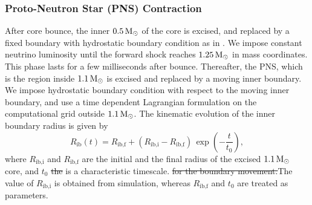 \documentclass[fleqn,usenatbib]{mnras}
\newcommand{\solm}{\xspace\ensuremath{\rm{M_{\odot}}}\xspace}
\newcommand{\NY}[2]{{\color{blue}\sout{#1}#2}}
\begin{document}
\subsubsection{Proto-Neutron Star (PNS) Contraction}\label{subsec:pnscontr}

After core bounce, the inner $0.5\, \solm$ of the core is excised, and replaced by a fixed boundary with hydrostatic boundary condition as in \citet{Ertl2016}. We impose constant neutrino luminosity until the forward shock reaches $1.25\, \solm$ in mass coordinates. This phase lasts for a few milliseconds after bounce. Thereafter, the PNS, which is the region inside $1.1\, \solm$ is  excised and replaced by a moving inner boundary. We impose hydrostatic boundary condition with respect to the moving inner boundary, and use a time dependent Lagrangian formulation on the computational grid outside $1.1\, \solm$. The kinematic evolution of the inner boundary radius is given by
\begin{equation}
    R_{\text{ib}}(t) = R_{\text{ib,f}} + (R_{\text{ib,i}} - R_{\text{ib,f}})\, \exp\left(-\frac{t}{t_0}\right),
\end{equation}
where $R_{\text{ib,i}}$ and $R_{\text{ib,f}}$ are the initial and the final radius of the excised $1.1\, \solm$ core, and $t_0$ \NY{the}{ is a} \NY{}{characteristic} timescale\NY{}{.} \NY{for the boundary movement.}{The value of $R_{\text{ib,i}}$ is obtained from simulation, whereas $R_{\text{ib,f}}$ and $t_0$ are treated as parameters.}
\end{document}
